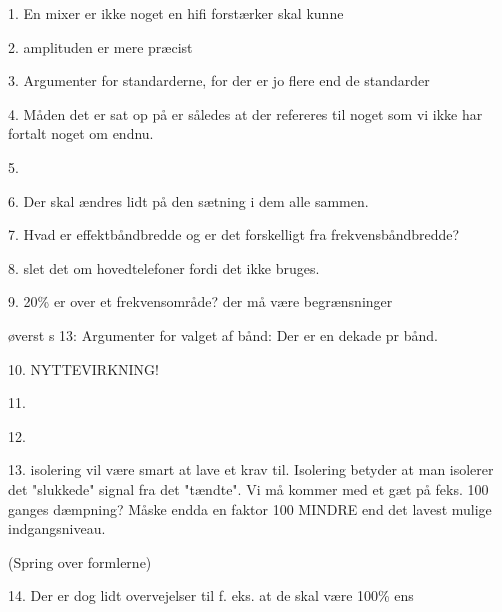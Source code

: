 1. En mixer er ikke noget en hifi forstærker skal kunne

2. amplituden er mere præcist

3.  Argumenter for standarderne, for der er jo flere end de standarder

4. Måden det er sat op på er således at der refereres til noget som vi ikke har fortalt noget om endnu.

5. 

6. Der skal ændres lidt på den sætning i dem alle sammen.

7. Hvad er effektbåndbredde og er det forskelligt fra frekvensbåndbredde?

8. slet det om hovedtelefoner fordi det ikke bruges.

9. 20\% er over et frekvensområde? der må være begrænsninger

øverst s 13: Argumenter for valget af bånd: Der er en dekade pr bånd.

10. NYTTEVIRKNING!

11.

12. 

13. isolering vil være smart at lave et krav til. Isolering betyder at man isolerer det "slukkede" signal fra det "tændte". Vi må kommer med et gæt på feks. 100 ganges dæmpning? Måske endda en faktor 100 MINDRE end det lavest mulige indgangsniveau.



(Spring over formlerne)


14. Der er dog lidt overvejelser til f. eks. at de skal være 100\% ens



